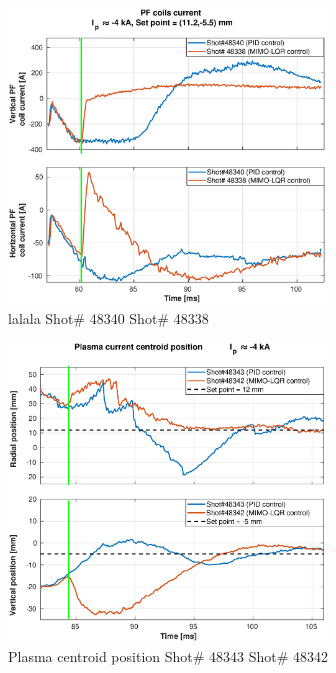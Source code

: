 \begin{figure}
	\centering
	\includegraphics[width=0.75\textwidth]{Chp5/PIDvsMIMO_340_338_curr_2.eps}
	\caption{lalala Shot\# 48340 Shot\# 48338}
\end{figure}

\begin{figure}
	\centering
	\includegraphics[width=0.75\textwidth]{Chp5/PIDvsMIMO_343_342_2.eps}
	\caption{Plasma centroid position Shot\# 48343 Shot\# 48342}
\end{figure}

